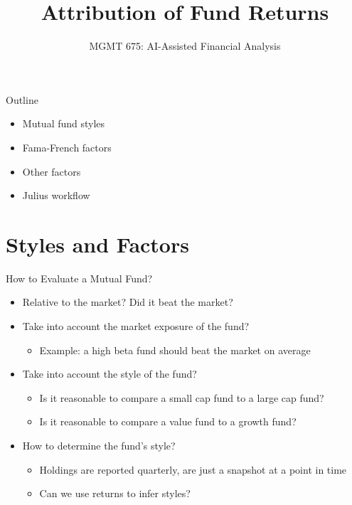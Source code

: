\documentclass[10pt]{beamer}
\title{Attribution of Fund Returns}
\subtitle{MGMT 675: AI-Assisted Financial Analysis}
\date{}
\begin{document}
\begin{frame}[plain]
\titlepage
\end{frame}

\begin{frame}{Outline}
\begin{itemize}
\item Mutual fund styles
\item Fama-French factors
\item Other factors
\item Julius workflow
\end{itemize}
\end{frame}

\section{Styles and Factors}

\begin{frame}{How to Evaluate a Mutual Fund?}
\begin{itemize}
\item Relative to the market?  Did it beat the market?
\item \pause Take into account the market exposure of the fund?  
\begin{itemize}
\item Example: a high beta fund should beat the market on average
\end{itemize}
\item Take into account the style of the fund?
\begin{itemize}
\item Is it reasonable to compare a small cap fund to a large cap fund?
\item Is it reasonable to compare a value fund to a growth fund?
\end{itemize}
\item \pause How to determine the fund's style?
\begin{itemize}
\item Holdings are reported quarterly, are just a snapshot at a point in time
\item Can we use returns to infer styles?
\end{itemize}
\end{itemize}
\end{frame}
\end{document}
